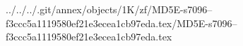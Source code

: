 ../../../.git/annex/objects/1K/zf/MD5E-s7096--f3ccc5a1119580ef21e3ecea1cb97eda.tex/MD5E-s7096--f3ccc5a1119580ef21e3ecea1cb97eda.tex